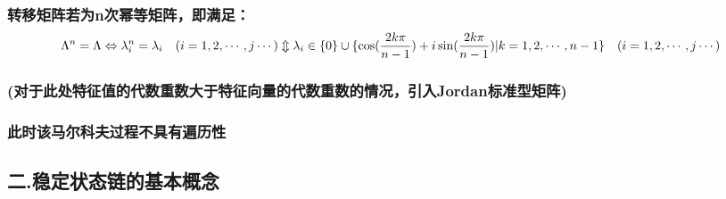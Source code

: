\documentclass[11pt]{article}
\begin{document}
\subsubsection{\texorpdfstring{转移矩阵若为n次幂等矩阵，即满足：\[\Lambda^n =\Lambda \Leftrightarrow \lambda_i^n =\lambda_i\quad (i=1,2,\cdots,j\cdots)\\
\Updownarrow\\
\lambda_i\in\{0\}\cup\{\cos(\frac{2k\pi}{n-1} )+i\sin(\frac{2k\pi}{n-1} )|k=1,2,\cdots,n-1\}\quad (i=1,2,\cdots,j\cdots)\]}{转移矩阵若为n次幂等矩阵，即满足：\textbackslash{}Lambda\^{}n =\textbackslash{}Lambda \textbackslash{}Leftrightarrow \textbackslash{}lambda\_i\^{}n =\textbackslash{}lambda\_i\textbackslash{}quad (i=1,2,\textbackslash{}cdots,j\textbackslash{}cdots)\textbackslash{}\textbackslash{}
\textbackslash{}Updownarrow\textbackslash{}\textbackslash{}
\textbackslash{}lambda\_i\textbackslash{}in\textbackslash{}\{0\textbackslash{}\}\textbackslash{}cup\textbackslash{}\{\textbackslash{}cos(\textbackslash{}frac\{2k\textbackslash{}pi\}\{n-1\} )+i\textbackslash{}sin(\textbackslash{}frac\{2k\textbackslash{}pi\}\{n-1\} )\textbar{}k=1,2,\textbackslash{}cdots,n-1\textbackslash{}\}\textbackslash{}quad (i=1,2,\textbackslash{}cdots,j\textbackslash{}cdots)}}\label{ux8f6cux79fbux77e9ux9635ux82e5ux4e3anux6b21ux5e42ux7b49ux77e9ux9635ux5373ux6ee1ux8db3lambdan-lambda-leftrightarrow-lambda_in-lambda_iquad-i12cdotsjcdotsupdownarrowlambda_iin0cupcosfrac2kpin-1-isinfrac2kpin-1-k12cdotsn-1quad-i12cdotsjcdots}

\subsubsection{(对于此处特征值的代数重数大于特征向量的代数重数的情况，引入Jordan标准型矩阵)}\label{ux5bf9ux4e8eux6b64ux5904ux7279ux5f81ux503cux7684ux4ee3ux6570ux91cdux6570ux5927ux4e8eux7279ux5f81ux5411ux91cfux7684ux4ee3ux6570ux91cdux6570ux7684ux60c5ux51b5ux5f15ux5165jordanux6807ux51c6ux578bux77e9ux9635}

\subsubsection{此时该马尔科夫过程不具有遍历性}\label{ux6b64ux65f6ux8be5ux9a6cux5c14ux79d1ux592bux8fc7ux7a0bux4e0dux5177ux6709ux904dux5386ux6027}

    \subsection{二.稳定状态链的基本概念}\label{ux4e8c.ux7a33ux5b9aux72b6ux6001ux94feux7684ux57faux672cux6982ux5ff5}
\end{document}
